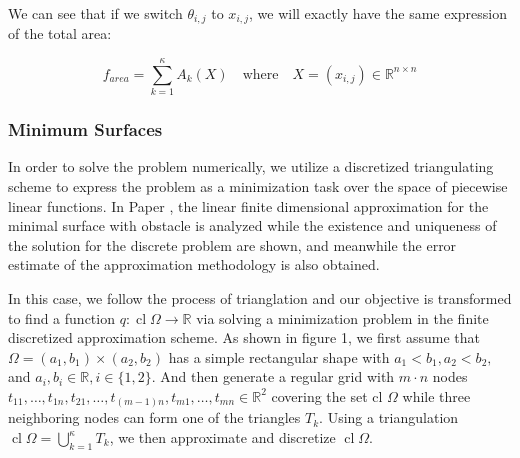 We can see that if we switch $\theta_{i,j}$ to $x_{i,j}$, we will exactly have the same expression of the total area:

\begin{equation}
    f_{area} = \sum\limits^{\kappa}_{k=1}A_{k}(X) \quad \text{where} \quad X=\left(x_{i, j}\right) \in \mathbb{R}^{n \times n}
\end{equation}


\subsubsection{Minimum Surfaces}
In order to solve the problem numerically, we utilize a discretized triangulating scheme to express the problem as a minimization task over the space of piecewise linear functions. In Paper \cite{shen1992finite}, the linear finite dimensional approximation for the minimal surface with obstacle is analyzed while the existence and uniqueness of the solution for the discrete problem are shown, and meanwhile the error estimate of the approximation methodology is also obtained. 

In this case, we follow the process of trianglation and our objective is transformed to find a function  $q: \operatorname{cl} \Omega \rightarrow \mathbb{R}$ via solving a minimization problem in the finite discretized approximation scheme. As shown in figure 1, we first assume that $\Omega=\left(a_{1}, b_{1}\right) \times\left(a_{2}, b_{2}\right)$ has a simple rectangular shape with $a_{1}<b_{1}, a_{2}<b_{2},$ and $a_{i}, b_{i} \in \mathbb{R}, i \in\{1,2\} .$ And then generate a regular grid with $m \cdot n$ nodes $t_{11}, \ldots, t_{1 n}, t_{21}, \ldots, t_{(m-1) n}, t_{m 1}, \ldots, t_{m n} \in \mathbb{R}^{2}$
covering the set cl $\Omega$ while three neighboring nodes can form one of the triangles $T_{k} .$ Using a triangulation $\operatorname{cl} \Omega=\bigcup_{k=1}^{\kappa} T_{k}$, we then approximate and discretize $\operatorname{cl} \Omega$.

